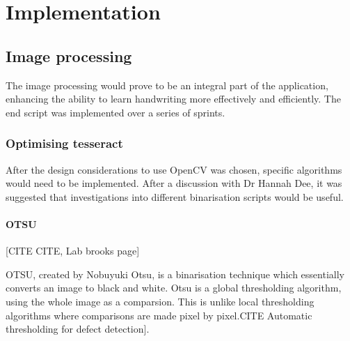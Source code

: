 \chapter{Implementation}




\section{Image processing}
The image processing would prove to be an integral part of the application, enhancing the ability to learn handwriting more effectively and efficiently. The end script was implemented over a series of sprints.
\subsection{Optimising tesseract}
After the design considerations to use OpenCV was chosen, specific algorithms would need to be implemented. After a discussion with Dr Hannah Dee, it was suggested that investigations into different binarisation scripts would be useful.

\subsubsection{OTSU}
[CITE CITE, Lab brooks page]

OTSU, created by Nobuyuki Otsu, is a binarisation technique which essentially converts an image to black and white. Otsu is a global thresholding algorithm, using the whole image as a comparsion. This is unlike local thresholding algorithms where comparisons are made pixel by pixel.CITE Automatic thresholding for defect detection].

